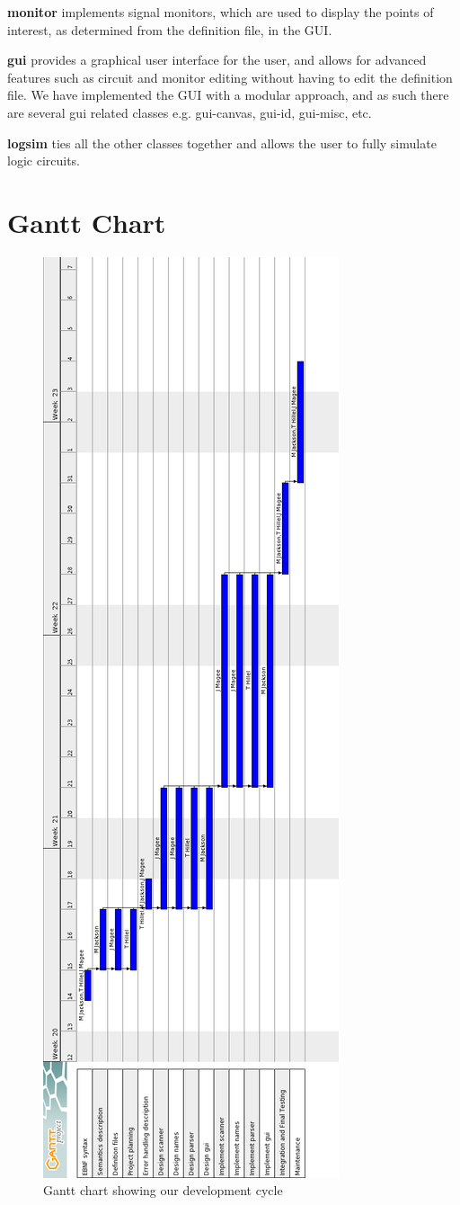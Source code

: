 \documentclass[a4paper,10pt]{article}
\begin{document}
\textbf{monitor} implements signal monitors, which are used to display the points of interest, as determined from the definition file, in the GUI.

\textbf{gui} provides a graphical user interface for the user, and allows for advanced features such as circuit and monitor editing without having to edit the definition file. We have implemented the GUI with a modular approach, and as such there are several gui related classes e.g. gui-canvas, gui-id, gui-misc, etc.

\textbf{logsim} ties all the other classes together and allows the user to fully simulate logic circuits.

\pagebreak

\section{Gantt Chart}
\label{sec:gantt}

\begin{figure}[h]
 \centering
  \includegraphics[height=.75\textheight]{../../report1/Gantt-Chart.png}
 \caption{Gantt chart showing our development cycle}
 \label{fig:ganttchart}
\end{figure}
\pagebreak
\end{document}
